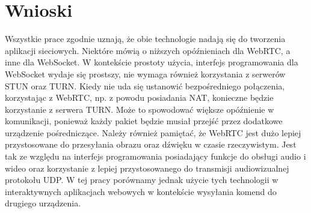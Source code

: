 \documentclass[language=polish,type=master]{aghmodern}
\begin{document}
\section{Wnioski}
Wszystkie prace zgodnie uznają, że obie technologie nadają się do tworzenia aplikacji sieciowych.
Niektóre mówią o niższych opóźnieniach dla WebRTC, a inne dla WebSocket.
W kontekście prostoty użycia, interfejs programowania dla WebSocket wydaje się prostszy, nie wymaga również korzystania z serwerów STUN oraz TURN.
Kiedy nie uda się ustanowić bezpośredniego połączenia, korzystając z WebRTC, np. z powodu posiadania NAT, konieczne będzie korzystanie z serwera TURN.
Może to spowodować większe opóźnienie w komunikacji, ponieważ każdy pakiet będzie musiał przejść przez dodatkowe urządzenie pośredniczące.
Należy również pamiętać, że WebRTC jest dużo lepiej przystosowane do przesyłania obrazu oraz dźwięku w czasie rzeczywistym.
Jest tak ze względu na interfejs programowania posiadający funkcje do obsługi audio i wideo oraz korzystanie z lepiej przystosowanego do transmisji audiowizualnej protokołu UDP.
W tej pracy porównamy jednak użycie tych technologii w interaktywnych aplikacjach webowych w kontekście wysyłania komend do drugiego urządzenia.
\end{document}
